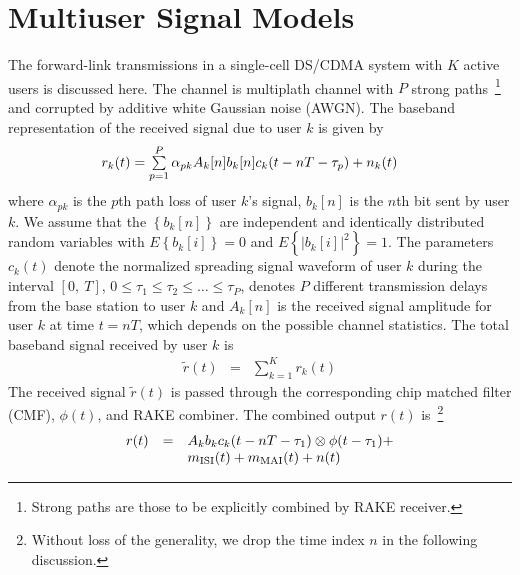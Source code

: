 \documentclass[a4paper,10pt,fleqn, twocolumn]{IEEETran}
\begin{document}
\section{Multiuser Signal Models}
The forward-link transmissions in a single-cell DS/CDMA system
with $K$ active users is discussed here. The channel is multiplath
channel with $P$ strong paths~\footnote{Strong paths are those to
be explicitly combined by RAKE receiver.} and corrupted by
additive white Gaussian noise (AWGN). The baseband representation
of the received signal due to user $k$ is given by
\begin{equation}
\begin{array}{l}\hspace{-0.2in}
r_k(t)=\sum\limits_{p=1}^{P}\alpha_{pk}A_k[n]
b_k[n]c_k(t-nT-\tau_p)+n_k(t)
\end{array}
\end{equation}
\noindent where $\alpha_{pk}$ is the $p$th path loss of user $k$'s
signal, $b_k{[n]}$ is the $n$th bit sent by user $k$. We assume
that the $\left\{b_k{[n]}\right\}$ are independent and identically
distributed random variables with $E\left\{b_k{[i]}\right\}=0$ and
$E\left\{|b_k{[i]}|^2\right\}=1$. The parameters $c_k(t)$ denote
the normalized spreading signal waveform of user $k$ during the
interval $[0,\ T]$, $0\leq\tau_1\leq\tau_2\leq\ldots\leq\tau_P$,
denotes $P$ different transmission delays from the base station to
user $k$ and $A_k[n]$ is the received signal amplitude for user
$k$ at time $t=nT$, which depends on the possible channel
statistics. The total baseband signal received by user $k$ is
\begin{equation}
\begin{array}{rcl}
\tilde{r}(t)&=&\sum\limits_{k=1}^{K}r_k(t)
\end{array}
\end{equation}
The received signal $\tilde{r}(t)$ is passed through the
corresponding chip matched filter (CMF), $\phi(t)$, and RAKE
combiner. The combined output $r(t)$ is~\footnote{Without loss of
the generality, we drop the time index $n$ in the following
discussion.}
\begin{equation}\hspace{-0.0in}
\begin{array}{rcl}
r(t)&=&A_k b_k c_k(t-nT-\tau_1)\otimes \phi(t-\tau_1)+ \\
&&\hspace{0.0in} m_{\rm ISI}(t) + m_{\rm MAI}(t) + n(t)
\end{array}\label{r_t}
\end{equation}
\end{document}
